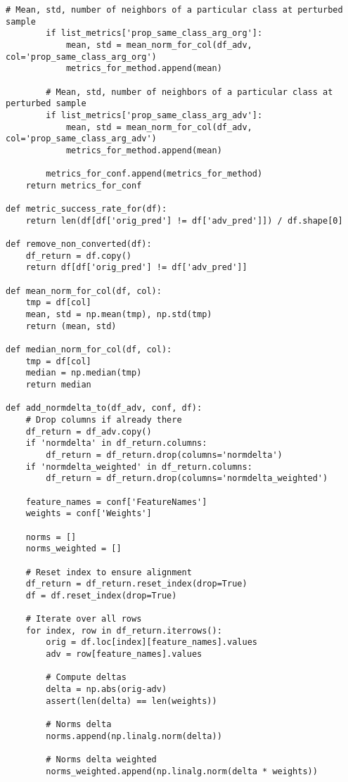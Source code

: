 \begin{lstlisting}[style=python, caption=評価指標の計算を行うMetrics.py]
        # Mean, std, number of neighbors of a particular class at perturbed sample
        if list_metrics['prop_same_class_arg_org']:
            mean, std = mean_norm_for_col(df_adv, col='prop_same_class_arg_org')
            metrics_for_method.append(mean)

        # Mean, std, number of neighbors of a particular class at perturbed sample
        if list_metrics['prop_same_class_arg_adv']:
            mean, std = mean_norm_for_col(df_adv, col='prop_same_class_arg_adv')
            metrics_for_method.append(mean)
            
        metrics_for_conf.append(metrics_for_method)
    return metrics_for_conf
  
def metric_success_rate_for(df):
    return len(df[df['orig_pred'] != df['adv_pred']]) / df.shape[0]

def remove_non_converted(df):
    df_return = df.copy()
    return df[df['orig_pred'] != df['adv_pred']]

def mean_norm_for_col(df, col):
    tmp = df[col]    
    mean, std = np.mean(tmp), np.std(tmp)
    return (mean, std)

def median_norm_for_col(df, col):
    tmp = df[col]    
    median = np.median(tmp)
    return median

def add_normdelta_to(df_adv, conf, df):
    # Drop columns if already there
    df_return = df_adv.copy()
    if 'normdelta' in df_return.columns:
        df_return = df_return.drop(columns='normdelta')
    if 'normdelta_weighted' in df_return.columns:
        df_return = df_return.drop(columns='normdelta_weighted')
        
    feature_names = conf['FeatureNames']
    weights = conf['Weights']

    norms = []
    norms_weighted = []

    # Reset index to ensure alignment
    df_return = df_return.reset_index(drop=True)
    df = df.reset_index(drop=True)
    
    # Iterate over all rows
    for index, row in df_return.iterrows():
        orig = df.loc[index][feature_names].values
        adv = row[feature_names].values 
        
        # Compute deltas
        delta = np.abs(orig-adv)
        assert(len(delta) == len(weights))
        
        # Norms delta
        norms.append(np.linalg.norm(delta))
        
        # Norms delta weighted
        norms_weighted.append(np.linalg.norm(delta * weights))


\end{lstlisting}
